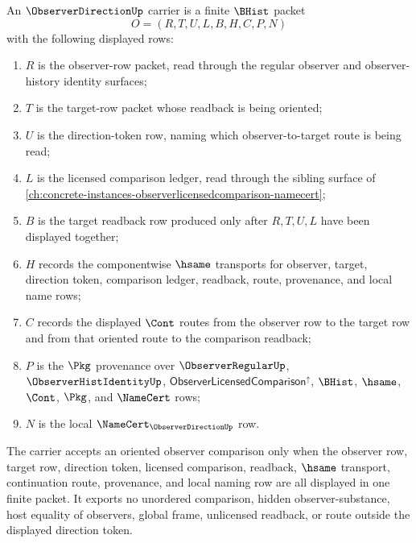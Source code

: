 \begin{definition}
\label{def:observer-direction-carrier}
An $\ObserverDirectionUp$ carrier is a finite $\BHist$ packet
$$
O=(R,T,U,L,B,H,C,P,N)
$$
with the following displayed rows:
\begin{enumerate}
\item $R$ is the observer-row packet, read through the regular observer and observer-history identity surfaces;
\item $T$ is the target-row packet whose readback is being oriented;
\item $U$ is the direction-token row, naming which observer-to-target route is being read;
\item $L$ is the licensed comparison ledger, read through the sibling surface of \autoref{ch:concrete-instances-observerlicensedcomparison-namecert};
\item $B$ is the target readback row produced only after $R,T,U,L$ have been displayed together;
\item $H$ records the componentwise $\hsame$ transports for observer, target, direction token, comparison ledger, readback, route, provenance, and local name rows;
\item $C$ records the displayed $\Cont$ routes from the observer row to the target row and from that oriented route to the comparison readback;
\item $P$ is the $\Pkg$ provenance over $\ObserverRegularUp$, $\ObserverHistIdentityUp$, $\mathsf{ObserverLicensedComparison}^{\uparrow}$, $\BHist$, $\hsame$, $\Cont$, $\Pkg$, and $\NameCert$ rows;
\item $N$ is the local $\NameCert_{\ObserverDirectionUp}$ row.
\end{enumerate}
The carrier accepts an oriented observer comparison only when the observer row, target row, direction token, licensed comparison, readback, $\hsame$ transport, continuation route, provenance, and local naming row are all displayed in one finite packet. It exports no unordered comparison, hidden observer-substance, host equality of observers, global frame, unlicensed readback, or route outside the displayed direction token.
\end{definition}

